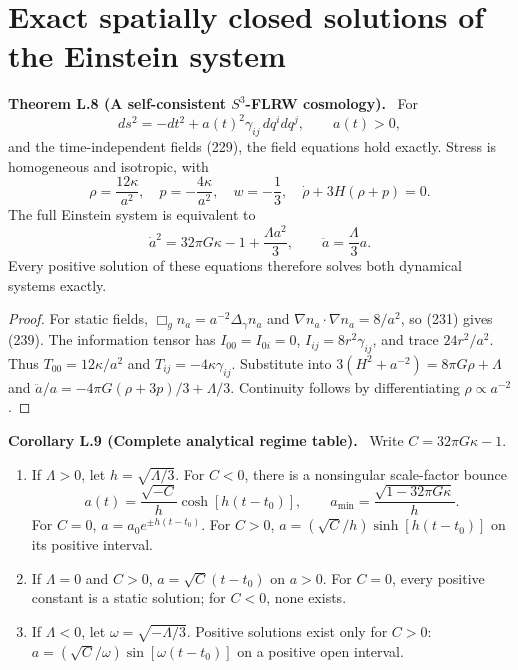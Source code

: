 \documentclass[11pt,a4paper,oneside]{book}
\newcommand{\statement}[3]{\par\medskip\noindent\textbf{#1 #2 (#3).}\ }
\begin{document}
\section{Exact spatially closed solutions of the Einstein system}
\statement{Theorem}{L.8}{A self-consistent $S^3$-FLRW cosmology}
For
\begin{equation}ds^2=-dt^2+a(t)^2\gamma_{ij}\,dq^idq^j,\qquad a(t)>0,\tag{242}\end{equation}
and the time-independent fields (229), the field equations hold exactly. Stress is homogeneous and isotropic, with
\begin{equation}\rho=\frac{12\kappa}{a^2},\quad p=-\frac{4\kappa}{a^2},\quad w=-\frac13,\quad\dot\rho+3H(\rho+p)=0.\tag{243}\end{equation}
The full Einstein system is equivalent to
\begin{equation}\dot a^2=32\pi G\kappa-1+\frac{\Lambda a^2}3,\qquad\ddot a=\frac\Lambda3a.\tag{244}\end{equation}
Every positive solution of these equations therefore solves both dynamical systems exactly.
\begin{proof}
For static fields, $\Box_gn_a=a^{-2}\Delta_\gamma n_a$ and $\nabla n_a\cdot\nabla n_a=8/a^2$, so (231) gives (239). The information tensor has $I_{00}=I_{0i}=0$, $I_{ij}=8r^2\gamma_{ij}$, and trace $24r^2/a^2$. Thus $T_{00}=12\kappa/a^2$ and $T_{ij}=-4\kappa\gamma_{ij}$. Substitute into $3(H^2+a^{-2})=8\pi G\rho+\Lambda$ and $\ddot a/a=-4\pi G(\rho+3p)/3+\Lambda/3$. Continuity follows by differentiating $\rho\propto a^{-2}$.
\end{proof}
\statement{Corollary}{L.9}{Complete analytical regime table}
Write $C=32\pi G\kappa-1$.
\begin{enumerate}[label=(\alph*)]
\item If $\Lambda>0$, let $h=\sqrt{\Lambda/3}$. For $C<0$, there is a nonsingular scale-factor bounce
\begin{equation}a(t)=\frac{\sqrt{-C}}h\cosh[h(t-t_0)],\qquad a_{\min}=\frac{\sqrt{1-32\pi G\kappa}}h.\tag{245}\end{equation}
For $C=0$, $a=a_0e^{\pm h(t-t_0)}$. For $C>0$, $a=(\sqrt C/h)\sinh[h(t-t_0)]$ on its positive interval.
\item If $\Lambda=0$ and $C>0$, $a=\sqrt C(t-t_0)$ on $a>0$. For $C=0$, every positive constant is a static solution; for $C<0$, none exists.
\item If $\Lambda<0$, let $\omega=\sqrt{-\Lambda/3}$. Positive solutions exist only for $C>0$: $a=(\sqrt C/\omega)\sin[\omega(t-t_0)]$ on a positive open interval.
\end{enumerate}
\end{document}
